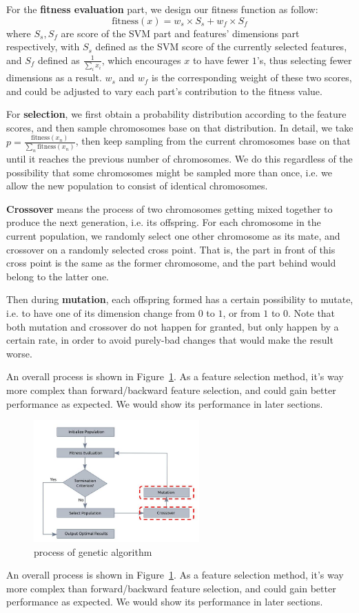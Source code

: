 \documentclass[journal]{IEEEtran}
\begin{document}
For the \textbf{fitness evaluation} part, we design our fitness function as follow:
$$
\mathrm{fitness}(x) = w_s\times S_s + w_f\times S_f
$$
where $S_s, S_f$ are score of the SVM part and features' dimensions part respectively, with $S_s$ defined as the SVM score of the currently selected features, and $S_f$ defined as $\frac{1}{\sum_i x_i}$, which encourages $x$ to have fewer $1$'s, thus selecting fewer dimensions as a result. $w_s$ and $w_f$ is the corresponding weight of these two scores, and could be adjusted to vary each part's contribution to the fitness value.

For \textbf{selection}, we first obtain a probability distribution according to the feature scores, and then sample chromosomes base on that distribution. In detail, we take $p = \frac{\mathrm{fitness}(x_n)}{\sum_n \mathrm{fitness}(x_n)}$, then keep sampling from the current chromosomes base on that until it reaches the previous number of chromosomes. We do this regardless of the possibility that some chromosomes might be sampled more than once, i.e. we allow the new population to consist of identical chromosomes.

\textbf{Crossover} means the process of two chromosomes getting mixed together to produce the next generation, i.e. its offspring. For each chromosome in the current population, we randomly select one other chromosome as its mate, and crossover on a randomly selected cross point. That is, the part in front of this cross point is the same as the former chromosome, and the part behind would belong to the latter one.

Then during \textbf{mutation}, each offspring formed has a certain possibility to mutate, i.e. to have one of its dimension change from $0$ to $1$, or from $1$ to $0$. Note that both mutation and crossover do not happen for granted, but only happen by a certain rate, in order to avoid purely-bad changes that would make the result worse.

An overall process is shown in Figure~\ref{fig:1}. As a feature selection method, it's way more complex than forward/backward feature selection, and could gain better performance as expected. We would show its performance in later sections. 
\begin{figure}[htpb]
  \centering
  \includegraphics[width=2.5in]{genetic_alg.jpg}
  \caption{process of genetic algorithm}
  \label{fig:1}
  \vspace{-3mm}
\end{figure}
An overall process is shown in Figure~\ref{fig:1}. As a feature selection method, it's way more complex than forward/backward feature selection, and could gain better performance as expected. We would show its performance in later sections.
\end{document}
